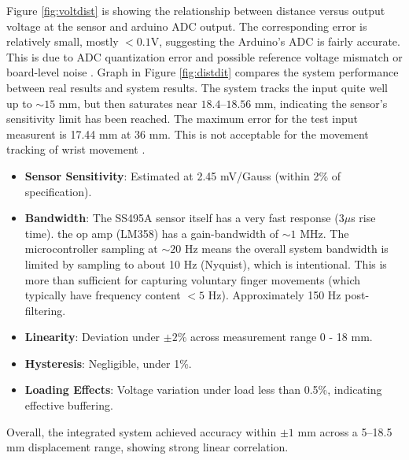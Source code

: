 \documentclass[a4paper,12pt]{article}
\begin{document}
Figure \ref{fig:voltdist} is showing the relationship between distance versus output voltage at the sensor and arduino ADC output. The corresponding error is relatively small, mostly $< 0.1$V, suggesting the Arduino's ADC is fairly accurate. This is due to ADC quantization error and possible reference voltage mismatch or board-level noise \cite{das_adc2020}. Graph in Figure \ref{fig:distdit} compares the system performance between real results and system results. The system tracks the input quite well up to $\sim 15$ mm, but then saturates near $18.4–18.56$ mm, indicating the sensor's sensitivity limit has been reached. The maximum error for the test input measurent is 17.44 mm at 36 mm. This is not acceptable for the movement tracking of wrist movement \cite{das_adc2020}.

\begin{itemize}
    \item \textbf{Sensor Sensitivity}: Estimated at 2.45 mV/Gauss (within 2\% of specification).
    \item \textbf{Bandwidth}: The SS495A sensor itself has a very fast response ($3 \mu$s rise time). the op amp (LM358) has a gain-bandwidth of $\sim 1$ MHz. The microcontroller sampling at $\sim 20$ Hz means the overall system bandwidth is limited by sampling to about 10 Hz (Nyquist), which is intentional. This is more than sufficient for capturing voluntary finger movements (which typically have frequency content $< 5$ Hz). Approximately 150 Hz post-filtering.
    \item \textbf{Linearity}: Deviation under $\pm2\%$ across measurement range 0 - 18 mm.
    \item \textbf{Hysteresis}: Negligible, under 1\%.
    \item \textbf{Loading Effects}: Voltage variation under load less than 0.5\%, indicating effective buffering.
\end{itemize}
\noindent
Overall, the integrated system achieved accuracy within $\pm 1$ mm across a 5--18.5 mm displacement range, showing strong linear correlation.


%
\end{document}
